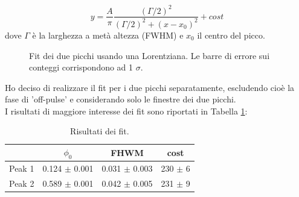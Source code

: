 \documentclass[a4paper,twocolumn]{article}
\begin{document}
\begin{large}
\begin{equation}
y = \frac{A}{\pi} \frac{(\Gamma /2)^2}{(\Gamma /2)^2 + (x - x_0)^2} + cost
\end{equation}
dove $\Gamma$ è la larghezza a metà altezza (FWHM) e $x_0$ il centro del picco.\\


\begin{figure}[h]
    \caption{\small Fit dei due picchi usando una Lorentziana. Le barre di errore sui conteggi corrispondono ad 1 $\sigma$.}
    \label{fit}
\end{figure}

\noindent
Ho deciso di realizzare il fit per i due picchi separatamente, escludendo cioè la fase di 'off-pulse' e considerando solo le finestre dei due picchi.\\
I risultati di maggiore interesse dei fit sono riportati in Tabella \ref{fitT}:

\begin{table}[H]
\centering

\begin{tabular}{lccc}
\hline
\hline
 & $\phi_0$ & FHWM & cost \\
\hline
Peak 1 & 0.124 $\pm$ 0.001 &  0.031 $\pm$ 0.003 & 230 $\pm$ 6 \\
Peak 2 & 0.589 $\pm$ 0.001 &  0.042 $\pm$ 0.005 & 231 $\pm$ 9 \\
\hline
\end{tabular}
\caption{\small Risultati dei fit.}
\label{fitT}
\end{table}


\end{large}
\end{document}

